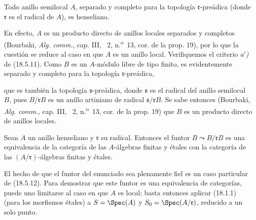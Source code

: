 \begin{proposition}[18.5.14]
\label{IV.18.5.14}
Todo anillo semilocal $A$, separado y completo para la topología $\mathfrak r$-preádica \textup{(}donde $\mathfrak r$ es el radical de $A$\textup{)}, es henseliano.
\end{proposition}

En efecto, $A$ es un producto directo de anillos locales separados y completos (Bourbaki, \emph{Alg. comm.}, cap. III, \textsection~2, n.\textsuperscript{o}~13, cor. de la prop. 19), por lo que la cuestión se reduce al caso en que $A$ es un anillo local. Verifiquemos el criterio \emph{a$'$)} de (18.5.11). Como $B$ es un $A$-módulo libre de tipo finito, es evidentemente separado y completo para la topología $\mathfrak r$-preádica,


que es también la topología $\mathfrak s$-preádica, donde $\mathfrak s$ es el radical del anillo semilocal $B$, pues $B/\mathfrak rB$ es un anillo artiniano de radical $\mathfrak s/\mathfrak rB$. Se sabe entonces (Bourbaki, \emph{Alg. comm.}, cap. III, \textsection~2, n.\textsuperscript{o}~13, cor. de la prop. 19) que $B$ es un producto directo de anillos locales.

\begin{proposition}[18.5.15]
\label{IV.18.5.15}
Sean $A$ un anillo henseliano y $\mathfrak r$ su radical. Entonces el funtor $B\leadsto B/\mathfrak rB$ es una equivalencia de la categoría de las $A$-álgebras finitas y étales con la categoría de las $(A/\mathfrak r)$-álgebras finitas y étales.
\end{proposition}

El hecho de que el funtor del enunciado sea plenamente fiel es un caso particular de (18.5.12). Para demostrar que este funtor es una equivalencia de categorías, puede uno limitarse al caso en que $A$ es local; basta entonces aplicar (18.1.1) (para los morfismos étales) a $S=\Spec(A)$ y $S_0=\Spec(A/\mathfrak r)$, reducido a un solo punto.

